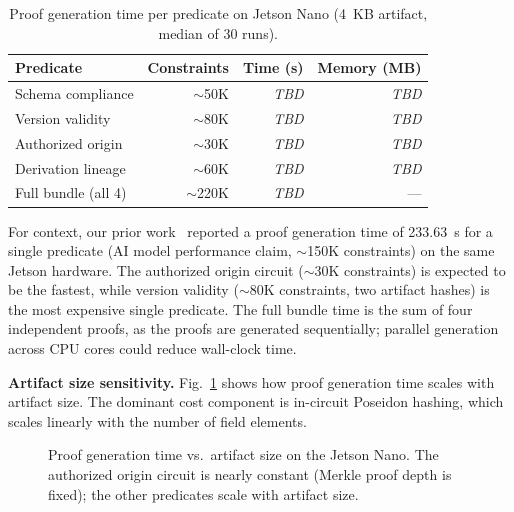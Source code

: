 \begin{table}[t]
\centering
\caption{Proof generation time per predicate on Jetson Nano (4~KB artifact, median of 30 runs).}
\label{tab:proof-gen}
\begin{tabular}{lrrr}
\toprule
\textbf{Predicate} & \textbf{Constraints} & \textbf{Time (s)} & \textbf{Memory (MB)} \\
\midrule
Schema compliance & $\sim$50K & \textit{TBD} & \textit{TBD} \\
Version validity & $\sim$80K & \textit{TBD} & \textit{TBD} \\
Authorized origin & $\sim$30K & \textit{TBD} & \textit{TBD} \\
Derivation lineage & $\sim$60K & \textit{TBD} & \textit{TBD} \\
\midrule
Full bundle (all 4) & $\sim$220K & \textit{TBD} & --- \\
\bottomrule
\end{tabular}
\end{table}

For context, our prior work~\cite{jagannath2025zksnark} reported a proof generation time of 233.63~s for a single predicate (AI model performance claim, $\sim$150K constraints) on the same Jetson hardware.
The authorized origin circuit ($\sim$30K constraints) is expected to be the fastest, while version validity ($\sim$80K constraints, two artifact hashes) is the most expensive single predicate.
The full bundle time is the sum of four independent proofs, as the proofs are generated sequentially; parallel generation across CPU cores could reduce wall-clock time.

\textbf{Artifact size sensitivity.}
Fig.~\ref{fig:proof-scaling} shows how proof generation time scales with artifact size.
The dominant cost component is in-circuit Poseidon hashing, which scales linearly with the number of field elements.

\begin{figure}[t]
\centering
{}
\caption{Proof generation time vs.\ artifact size on the Jetson Nano. The authorized origin circuit is nearly constant (Merkle proof depth is fixed); the other predicates scale with artifact size.}
\label{fig:proof-scaling}
\end{figure}

